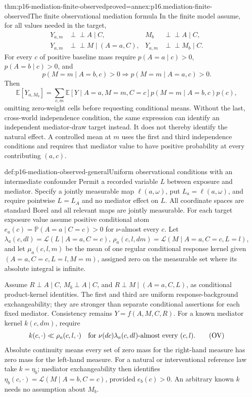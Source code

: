 \begin{hbtheorem}{thm:p16-mediation-finite-observed}{proved=annex:p16.mediation-finite-observed}{The finite observational mediation formula}
In the finite model assume, for all values needed in the target,
\[
\begin{aligned}
 Y_{a,m}&\mathrel{\perp\!\!\!\perp}A\mid C,&
 M_b&\mathrel{\perp\!\!\!\perp}A\mid C,\\
 Y_{a,m}&\mathrel{\perp\!\!\!\perp}M\mid(A=a,C),&
 Y_{a,m}&\mathrel{\perp\!\!\!\perp}M_b\mid C.
\end{aligned}
\]
For every \(c\) of positive baseline mass require
\(p(A=a\mid c)>0\), \(p(A=b\mid c)>0\), and
\[
 p(M=m\mid A=b,c)>0\Longrightarrow p(M=m\mid A=a,c)>0.
\]
Then
\[
 \mathbb E[Y_{a,M_b}]
 =\sum_{c,m} \mathbb E[Y\mid A=a,M=m,C=c]
                       p(M=m\mid A=b,c)p(c),               \tag{OMF}
\]
omitting zero-weight cells before requesting conditional means. Without
the last, cross-world independence condition, the same expression can
identify an independent mediator-draw target instead. It does not thereby
identify the natural effect. A controlled mean at \(m\) uses the first
and third independence conditions and requires that mediator value to
have positive probability at every contributing \((a,c)\).
\end{hbtheorem}

\begin{hbdefinition}{def:p16-mediation-observed-general}{Uniform observational conditions with an intermediate confounder}
Permit a recorded variable \(L\) between exposure and mediator. Specify
a jointly measurable map \(\ell(a,\omega)\), put \(L_a=\ell(a,\omega)\),
and require pointwise \(L=L_A\) and no mediator effect on \(L\). All coordinate spaces
are standard Borel and all relevant maps are jointly measurable.
For each target exposure value assume positive conditional atom
\(e_a(c)=\mathbb P(A=a\mid C=c)>0\) for \(\nu\)-almost every \(c\).
Let \(\lambda_a(c,dl)=\mathcal L(L\mid A=a,C=c)\),
\(\rho_a(c,l,dm)=\mathcal L(M\mid A=a,C=c,L=l)\), and let
\(\mu_a(c,l,m)\) be the mean of one regular conditional response kernel
given \((A=a,C=c,L=l,M=m)\), assigned zero on the measurable set where
its absolute integral is infinite.

Assume \(R\perp A\mid C\), \(M_b\perp A\mid C\), and
\(R\perp M\mid(A=a,C,L)\), as conditional product-kernel identities.
The first and third are uniform response-background exchangeability;
they are stronger than separate conditional assertions for each fixed
mediator. Consistency remains \(Y=f(A,M,C,R)\).
For a known mediator kernel \(k(c,dm)\), require
\[
 k(c,\cdot)\ll\rho_a(c,l,\cdot)
 \quad\hbox{for }\nu(dc)\lambda_a(c,dl)\hbox{-almost every }(c,l). \tag{OV}
\]
Absolute continuity means every set of zero mass for the right-hand
measure has zero mass for the left-hand measure. For a natural or
interventional reference law take \(k=\eta_b\); mediator exchangeability
then identifies \(\eta_b(c,\cdot)=\mathcal L(M\mid A=b,C=c)\), provided
\(e_b(c)>0\). An arbitrary known \(k\) needs no assumption about \(M_b\).
\end{hbdefinition}

